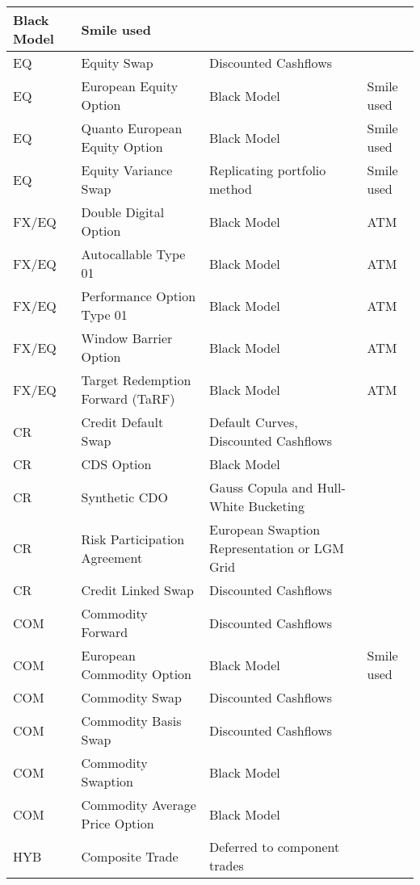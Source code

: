 {\begin{supertabular}{|p{1cm}|p{5cm}|p{5cm}|p{2cm}|}
Black Model &
Smile used\\
\hline
EQ	&
Equity Swap	&
Discounted Cashflows	&
\\
\hline
EQ	& 
European Equity Option	&
Black Model	&
Smile used
\\
\hline
EQ	& 
Quanto European Equity Option	&
Black Model	&
Smile used
\\
\hline
EQ	&
Equity Variance Swap	&
Replicating portfolio method &
Smile used \\
\hline
\hline
FX/EQ	&
Double Digital Option	&
Black Model	&
ATM \\
\hline
FX/EQ	&
Autocallable Type 01	&
Black Model	&
ATM \\
\hline
FX/EQ	&
Performance Option Type 01	&
Black Model	&
ATM \\
\hline
FX/EQ	&
Window Barrier Option &
Black Model	&
ATM \\
\hline
FX/EQ	&
Target Redemption Forward (TaRF)	&
Black Model	&
ATM \\
\hline
\hline
CR	&
Credit Default Swap	&
Default Curves, Discounted Cashflows	&
\\
\hline
CR	&
CDS Option	&
Black Model	&
\\
\hline
CR	&
Synthetic CDO &
Gauss Copula and Hull-White Bucketing	&
\\
\hline
CR	&
Risk Participation Agreement &
European Swaption Representation or LGM Grid &
\\
\hline
CR	&
Credit Linked Swap &
Discounted Cashflows &
\\
\hline
\hline
COM	&
Commodity Forward	&
Discounted Cashflows	&
\\
\hline
COM	&
European Commodity Option	&
Black Model	&
Smile used \\
\hline
COM	&
Commodity Swap	&
Discounted Cashflows	&
\\
\hline
COM	&
Commodity Basis Swap	&
Discounted Cashflows	&
\\
\hline
COM	&
Commodity Swaption	&
Black Model 	&
\\
\hline
COM	&
Commodity Average Price Option&
Black Model 	&
\\
\hline
\hline
HYB	&
Composite Trade	&
Deferred to component trades &
\\
\hline
\end{supertabular}
}
